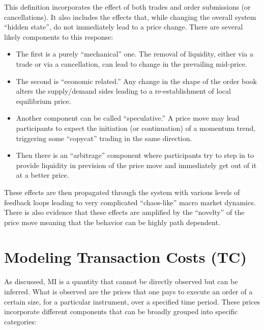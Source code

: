 This definition incorporates the effect of both trades and order submissions (or cancellations). It also includes the effects that, while changing the overall system ``hidden state'', do not immediately lead to a price change. There are several likely components to this response:
        \begin{itemize}
        \item The first is a purely ``mechanical'' one. The removal of liquidity, either via a trade or via a cancellation, can lead to change in the prevailing mid-price.
        \item The second is ``economic related.'' Any change in the shape of the order book alters the supply/demand sides leading to a re-establishment of local equilibrium price. 
        \item Another component can be called ``speculative.'' A price move may lead participants to expect the initiation (or continuation) of a momentum trend, triggering some ``copycat'' trading in the same direction.
        \item Then there is an ``arbitrage'' component where participants try to step in to provide liquidity in prevision of the price move and immediately get out of it at a better price.
        \end{itemize} 


These effects are then propagated through the system with various levels of feedback loops leading to very complicated ``chaos-like'' macro market dynamics. There is also evidence that these effects are amplified by the ``novelty'' of the price move meaning that the behavior can be highly path dependent. 



\section{Modeling Transaction Costs (TC)\label{sec:model_trans_cost}}\label{in:transcost1}

As discussed, MI is a quantity that cannot be directly observed but can be inferred. What is observed are the prices that one pays to execute an order of a certain size, for a particular instrument, over a specified time period. These prices incorporate different components that can be broadly grouped into specific categories:

